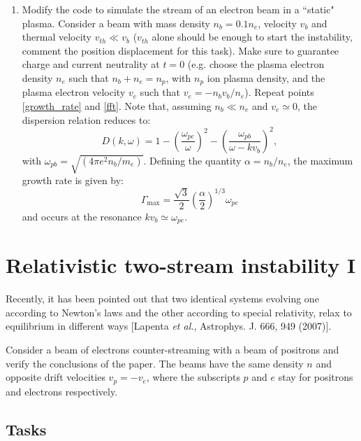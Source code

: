 \documentclass[]{exam}
\begin{document}
\begin{enumerate}
\item Modify the code to simulate the stream of an electron beam in a ``static" plasma. Consider a beam with mass density $n_b = 0.1 n_e$, velocity $v_b$ and thermal velocity $v_{th} \ll v_b$ ($v_{th}$ alone should be enough to start the instability, comment the position displacement for this task). Make sure to guarantee charge and current neutrality at $t=0$ (e.g. choose the plasma electron density $n_e$ such that $n_b+n_e=n_p$, with $n_p$ ion plasma density, and the plasma electron velocity $v_e$ such that $v_e=-n_bv_b/n_e$). Repeat points \ref{growth_rate} and \ref{fft}. Note that, assuming $n_b \ll n_e$ and $v_e \simeq 0$, the dispersion relation reduces to:
\begin{equation}
D(k,\omega) = 1-\left(\frac{\omega_{pe}}{\omega}\right)^2-\left(\frac{\omega_{pb}}{\omega-kv_b}\right)^2, \label{DR2}
\end{equation}
with $\omega_{pb}=\sqrt{\left(4\pi e^2 n_b/m_e\right)}$. Defining the quantity $\alpha=n_b/n_e$, the maximum growth rate is given by:
\begin{equation}
\Gamma_{\text{max}}=\frac{\sqrt{3}}{2}\left(\frac{\alpha}{2}\right)^{1/3}\omega_{pe}
\end{equation}
and occurs at the resonance $kv_b \simeq \omega_{pe}$.

\end{enumerate}

\section{Relativistic two-stream instability I}

Recently, it has been pointed out that two identical systems evolving one according to Newton's laws and the other according to special relativity, relax to equilibrium in different ways [Lapenta \textit{et al.}, Astrophys. J. 666, 949 (2007)]. 

Consider a beam of electrons counter-streaming with a beam of positrons and verify the conclusions of the paper. The beams have the same density $n$ and opposite drift velocities $v_p = -v_e$, where the subscripts $p$ and $e$ stay for positrons and electrons respectively.

\subsection{Tasks}
\end{document}
